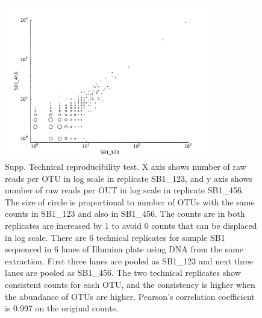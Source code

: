 \documentclass[12pt]{article}
\begin{document}
\begin{figure}[tbph!]
  \centering
  \includegraphics[width=0.8\textwidth]{figs/SB1_techrep_OTUscat}

  \caption[Technical reproducibility test]{Supp. Technical
  reproducibility test. X axis shows number of raw reads per OTU in
  log scale in replicate SB1\_123, and y axis shows number of raw
  reads per OUT in log scale in replicate SB1\_456. The size of circle
  is proportional to number of OTUs with the same counts in SB1\_123
  and also in SB1\_456. The counts are in both replicates are
  increased by 1 to avoid 0 counts that can be displaced in log
  scale. There are 6 technical replicates for sample SB1 sequenced in
  6 lanes of Illumina plate using DNA from the same extraction. First
  three lanes are pooled as SB1\_123 and next three lanes are pooled
  as SB1\_456. The two technical replicates show consistent counts for
  each OTU, and the consistency is higher when the abundance of OTUs
  are higher. Pearson’s correlation coefficient is 0.997 on the
  original counts.}

  \label{fig:SB1_techrep_OTUscat}
\end{figure}
\end{document}
